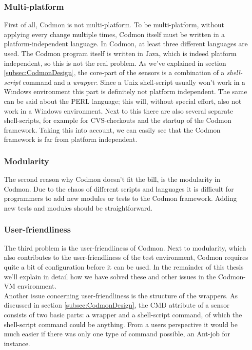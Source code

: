 \documentclass{article}
\newcommand{\project}{Codmon-VM}
\begin{document}
\subsubsection{Multi-platform}
\label{prob:multi}
First of all, Codmon is not multi-platform. To be multi-platform, without applying every change multiple times, Codmon itself must be written in a platform-independent language. 
In Codmon, at least three different languages are used. The Codmon program itself is written in Java, which is indeed platform independent\cite{Java}, so this is not the real problem. As we've explained in 
section \ref{subsec:CodmonDesign}, the core-part of the sensors is a combination of a \emph{shell-script} command and a \emph{wrapper}. Since a Unix shell-script usually won't work in a Windows environment 
this part is definitely not platform independent. The same can be said about the PERL language; this will, without special effort, also not work in a Windows environment. Next to this there are also several 
separate shell-scripts, for example for  CVS-checkouts and the startup of the Codmon framework. Taking this into account, we can easily see that the Codmon framework is far from platform independent.

\subsubsection{Modularity}
\label{prob:modular} 
The second reason why Codmon doesn't fit the bill, is the modularity in Codmon. Due to the chaos of different scripts and languages it is difficult for programmers to add new modules or tests to the Codmon 
framework. Adding new tests and modules should be straightforward. 

\subsubsection{User-friendliness}
\label{prob:user}
The third problem is the user-friendliness of Codmon. Next to modularity, which also contributes to the user-friendliness of the test environment, Codmon requires quite a bit of configuration before it can 
be used. In the remainder of this thesis we'll explain in detail how we have solved these and other issues in the \project{} environment.\\
 
\noindent Another issue concerning user-friendliness is the structure of the wrappers. As discussed in section \ref{subsec:CodmonDesign}, the CMD attribute of a sensor consists of two basic parts: 
a wrapper and a shell-script command, of which the shell-script command could be anything. From a users perspective it would be much easier if there was only one type of command possible, an Ant-job\cite{Ant} 
for instance.\\
\end{document}
